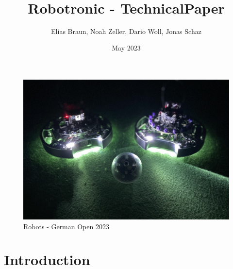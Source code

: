 \documentclass{scrartcl}
\title{Robotronic - TechnicalPaper}
\author{Elias Braun, Noah Zeller, Dario Woll, Jonas Schaz}
\date{May 2023}
\begin{document}
\maketitle

\begin{figure}[h]
    \centering
    \includegraphics[width=\textwidth]{img/Robotronic-Robots.JPEG}
    \caption{Robots - German Open 2023}
    \label{fig:robots}
\end{figure}
\newpage

\tableofcontents
\newpage

\section{Introduction}
\end{document}
